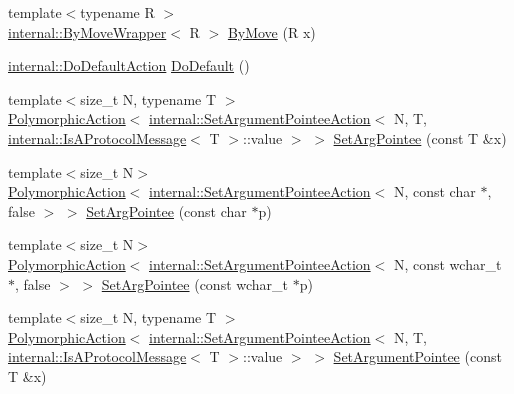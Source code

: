 \begin{DoxyCompactItemize}
{\footnotesize template$<$typename R $>$ }\\\mbox{\hyperlink{structtesting_1_1internal_1_1ByMoveWrapper}{internal\+::\+By\+Move\+Wrapper}}$<$ R $>$ \mbox{\hyperlink{namespacetesting_acaa432211a3aec62e3d0f24b47bd2dae}{By\+Move}} (R x)
\item 
\mbox{\hyperlink{classtesting_1_1internal_1_1DoDefaultAction}{internal\+::\+Do\+Default\+Action}} \mbox{\hyperlink{namespacetesting_ae041df61ff61ccb9753ba15b4309e1a6}{Do\+Default}} ()
\item 
{\footnotesize template$<$size\+\_\+t N, typename T $>$ }\\\mbox{\hyperlink{classtesting_1_1PolymorphicAction}{Polymorphic\+Action}}$<$ \mbox{\hyperlink{classtesting_1_1internal_1_1SetArgumentPointeeAction}{internal\+::\+Set\+Argument\+Pointee\+Action}}$<$ N, T, \mbox{\hyperlink{structtesting_1_1internal_1_1IsAProtocolMessage}{internal\+::\+Is\+A\+Protocol\+Message}}$<$ T $>$\+::value $>$ $>$ \mbox{\hyperlink{namespacetesting_a5740a5033b88c37666fcd09a269d123f}{Set\+Arg\+Pointee}} (const T \&x)
\item 
{\footnotesize template$<$size\+\_\+t N$>$ }\\\mbox{\hyperlink{classtesting_1_1PolymorphicAction}{Polymorphic\+Action}}$<$ \mbox{\hyperlink{classtesting_1_1internal_1_1SetArgumentPointeeAction}{internal\+::\+Set\+Argument\+Pointee\+Action}}$<$ N, const char $\ast$, false $>$ $>$ \mbox{\hyperlink{namespacetesting_a4a190fd2d02fb7cd79c5b3df3f80b647}{Set\+Arg\+Pointee}} (const char $\ast$p)
\item 
{\footnotesize template$<$size\+\_\+t N$>$ }\\\mbox{\hyperlink{classtesting_1_1PolymorphicAction}{Polymorphic\+Action}}$<$ \mbox{\hyperlink{classtesting_1_1internal_1_1SetArgumentPointeeAction}{internal\+::\+Set\+Argument\+Pointee\+Action}}$<$ N, const wchar\+\_\+t $\ast$, false $>$ $>$ \mbox{\hyperlink{namespacetesting_ac128085b4a8d64563fd5ccef324ea177}{Set\+Arg\+Pointee}} (const wchar\+\_\+t $\ast$p)
\item 
{\footnotesize template$<$size\+\_\+t N, typename T $>$ }\\\mbox{\hyperlink{classtesting_1_1PolymorphicAction}{Polymorphic\+Action}}$<$ \mbox{\hyperlink{classtesting_1_1internal_1_1SetArgumentPointeeAction}{internal\+::\+Set\+Argument\+Pointee\+Action}}$<$ N, T, \mbox{\hyperlink{structtesting_1_1internal_1_1IsAProtocolMessage}{internal\+::\+Is\+A\+Protocol\+Message}}$<$ T $>$\+::value $>$ $>$ \mbox{\hyperlink{namespacetesting_a03b315d27c91a8e719f2b6c09964130b}{Set\+Argument\+Pointee}} (const T \&x)

\end{DoxyCompactItemize}
